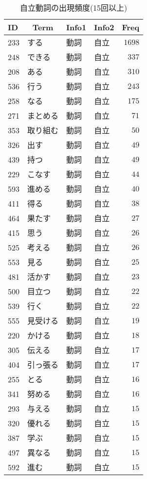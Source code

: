 %
\begin{table}[!tbp]
\caption{自立動詞の出現頻度(15回以上)\label{tab:自立動詞}} 
\begin{center}
\begin{tabular}{llllr}
\toprule
\multicolumn{1}{l}{ID}&\multicolumn{1}{c}{Term}&\multicolumn{1}{c}{Info1}&\multicolumn{1}{c}{Info2}&\multicolumn{1}{c}{Freq}\tabularnewline
\midrule
233&する&動詞&自立&$1698$\tabularnewline
248&できる&動詞&自立&$ 337$\tabularnewline
208&ある&動詞&自立&$ 310$\tabularnewline
536&行う&動詞&自立&$ 243$\tabularnewline
258&なる&動詞&自立&$ 175$\tabularnewline
271&まとめる&動詞&自立&$  71$\tabularnewline
353&取り組む&動詞&自立&$  50$\tabularnewline
326&出す&動詞&自立&$  49$\tabularnewline
439&持つ&動詞&自立&$  49$\tabularnewline
229&こなす&動詞&自立&$  44$\tabularnewline
593&進める&動詞&自立&$  40$\tabularnewline
411&得る&動詞&自立&$  38$\tabularnewline
464&果たす&動詞&自立&$  27$\tabularnewline
415&思う&動詞&自立&$  26$\tabularnewline
525&考える&動詞&自立&$  26$\tabularnewline
553&見る&動詞&自立&$  25$\tabularnewline
481&活かす&動詞&自立&$  23$\tabularnewline
500&目立つ&動詞&自立&$  22$\tabularnewline
539&行く&動詞&自立&$  22$\tabularnewline
555&見受ける&動詞&自立&$  19$\tabularnewline
220&かける&動詞&自立&$  18$\tabularnewline
305&伝える&動詞&自立&$  17$\tabularnewline
404&引っ張る&動詞&自立&$  17$\tabularnewline
255&とる&動詞&自立&$  16$\tabularnewline
341&努める&動詞&自立&$  16$\tabularnewline
293&与える&動詞&自立&$  15$\tabularnewline
320&優れる&動詞&自立&$  15$\tabularnewline
387&学ぶ&動詞&自立&$  15$\tabularnewline
497&異なる&動詞&自立&$  15$\tabularnewline
592&進む&動詞&自立&$  15$\tabularnewline
\bottomrule
\end{tabular}
\end{center}
\end{table}

